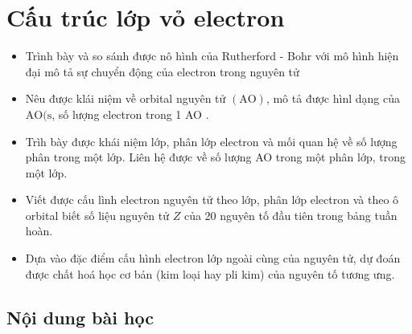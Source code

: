 \section{Cấu trúc lớp vỏ electron}
\begin{Muctieu}
	\begin{itemize}
		\item  Trình bày và so sánh được nô hình của Rutherford - Bohr với mô hình hiện đại mô tả sự chuyển động của electron trong nguyên tử
		\item  Nêu được klái niệm về orbital nguyên tử $(\mathrm{AO})$, mô tả được hìnl dạng của $\mathrm{AO}(\mathrm{s}$, số lượng electron trong 1 AO .
		\item  Trìh bày được khái niệm lớp, phân lớp electron và mối quan hệ về số lượng phân trong một lớp. Liên hệ được về số lượng AO trong một phân lớp, trong một lớp.
		\item  Viết được cấu lình electron nguyên tử theo lớp, phân lớp electron và theo ô orbital biết số liệu nguyên tử $Z$ của 20 nguyên tố đầu tiên trong bảng tuần hoàn.
		\item  Dựa vào đặc điểm cấu hình electron lớp ngoài cùng của nguyên tử, dự đoán được chất hoá học cơ bản (kim loại hay pli kim) của nguyên tố tương ưng.
	\end{itemize}
\end{Muctieu}
\subsection{Nội dung bài học}
